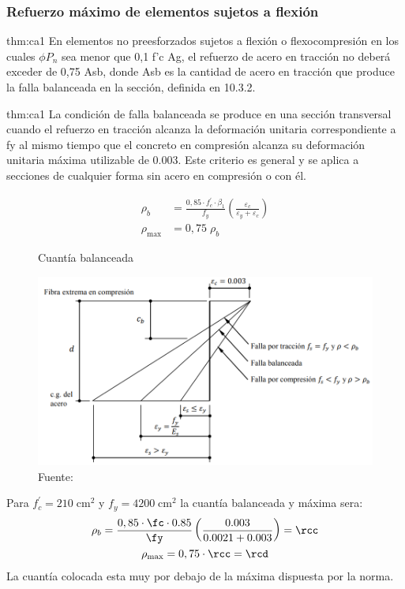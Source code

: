 \subsubsection{Refuerzo máximo de elementos sujetos a flexión}
\begin{theo}[Art. 10.3.4 E-060 :]{thm:ca1}
En elementos no preesforzados sujetos a flexión o flexocompresión en los cuales $\phi P_{n}$ sea menor que 0,1 f’c Ag, el refuerzo de acero en tracción no deberá exceder de 0,75 Asb, donde Asb es la cantidad de acero en tracción que produce la falla balanceada en la sección, definida en 10.3.2.
\end{theo}

\begin{theo}{thm:ca1}
La condición de falla balanceada se produce en una sección transversal cuando el refuerzo en tracción alcanza la deformación unitaria correspondiente a fy al mismo tiempo que el concreto en compresión alcanza su deformación unitaria máxima utilizable de 0.003. Este criterio es general y se aplica a secciones de cualquier forma sin acero en compresión o con él.
\end{theo}
\begin{align}
\rho_{b}&=\frac{0,85 \cdot f_{c}^{\prime} \cdot \beta_{1}}{f_{y}}\left(\frac{\varepsilon_{c}}{\varepsilon_{y}+\varepsilon_{c}}\right)\\
\rho_{\max }&=0,75\;\rho_{b}
\end{align}
\begin{figure}[h!]
    \centering
    \caption{Cuantía balanceada}
    \includegraphics[scale=0.6]{IMAGENES/d1.PNG}
    \caption*{\small Fuente: \it \cite{cordova2015}}
    \label{ver}
\end{figure}
\newpage
\noindent
Para $f_{c}^{\prime}=210\;\mathrm{cm}^{2}$ y $f_{y}=4200\;\mathrm{cm}^{2}$ la cuantía balanceada y máxima sera:
\begin{gather*}
\rho_{b}=\frac{0,85 \cdot \fc \cdot 0.85}{\fy}\left(\frac{0.003}{0.0021+0.003}\right)=\rcc\\
\rho_{\max }=0,75\cdot\rcc=\rcd
\end{gather*}
\noindent La cuantía colocada esta muy por debajo de la máxima dispuesta por la norma.
